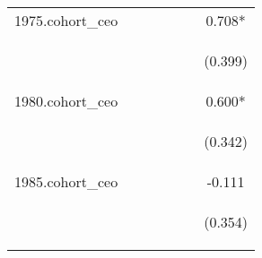 \begin{center}
\begin{tabular}{lcccccc}
1975.cohort\_ceo &  &  &  &  &  & 0.708* \\
\vspace{4pt} & \begin{footnotesize}\end{footnotesize} & \begin{footnotesize}\end{footnotesize} & \begin{footnotesize}\end{footnotesize} & \begin{footnotesize}\end{footnotesize} & \begin{footnotesize}\end{footnotesize} & \begin{footnotesize}(0.399)\end{footnotesize} \\
1980.cohort\_ceo &  &  &  &  &  & 0.600* \\
\vspace{4pt} & \begin{footnotesize}\end{footnotesize} & \begin{footnotesize}\end{footnotesize} & \begin{footnotesize}\end{footnotesize} & \begin{footnotesize}\end{footnotesize} & \begin{footnotesize}\end{footnotesize} & \begin{footnotesize}(0.342)\end{footnotesize} \\
1985.cohort\_ceo &  &  &  &  &  & -0.111 \\
\vspace{4pt} & \begin{footnotesize}\end{footnotesize} & \begin{footnotesize}\end{footnotesize} & \begin{footnotesize}\end{footnotesize} & \begin{footnotesize}\end{footnotesize} & \begin{footnotesize}\end{footnotesize} & \begin{footnotesize}(0.354)\end{footnotesize} \\

\end{tabular}
\end{center}
